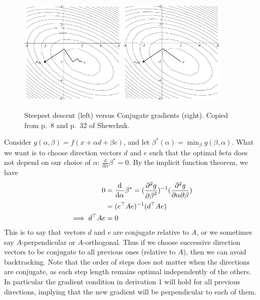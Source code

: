 \documentclass[11pt]{article}
\newcommand{\T}{\top}
\renewcommand{\(}{\left(}
\renewcommand{\)}{\right)}
\newcommand{\partbyby}[3]{{\partial^2 #1\over \partial #2 \partial #3}}
\newcommand{\partbyt}[2]{{\partial^2 #1\over {\partial #2}^2}}
\newcommand{\ud}{\mathrm{d}}
\newcommand{\dby}[2]{\frac{\ud #1}{\ud #2}}
\begin{document}
\begin{enumerate}
\begin{figure}[h]
\parbox{\textwidth}{
  \includegraphics[width=0.45\textwidth]{images/shewchuk-p-8.png}
  \hfill
  \includegraphics[width=0.45\textwidth]{images/shewchuk-p-32.png}
}
\caption{Steepest descent (left) versus Conjugate gradients (right).
  Copied from p.~8 and p.~32 of Shewchuk.}
\end{figure}


Consider $g(\alpha,\beta)=f(x+\alpha d + \beta e)$, and let
$\beta^*(\alpha)=\min_\beta g(\beta,\alpha)$. What we want is to
choose direction vectors $d$ and $e$ such that the optimal $beta$ does
not depend on our choice of $\alpha$: $\dby{}{\alpha}\beta^* = 0$. By
the implicit function theorem, we have
\begin{align}
0 &= \dby{}{\alpha}\beta^* = (\partbyt{g}{\beta})^{-1} (\partbyby{g}{\alpha}{\beta}) \\
&= (e^\T A e)^{-1} (d^\T A e) \\
\implies d^\T A e &= 0
\end{align}
This is to say that vectors $d$ and $e$ are conjugate relative to $A$,
or we sometimes say $A$-perpendicular or $A$-orthogonal. Thus if we
choose successive direction vectors to be conjugate to all previous
ones (relative to $A$), then we can avoid backtracking. Note that the
order of steps does not matter when the directions are conjugate, as
each step length remains optimal independently of the others. In
particular the gradient condition in derivation 1 will hold for all
previous directions, implying that the new gradient will be
perpendicular to each of them.


\end{enumerate}
\end{document}

